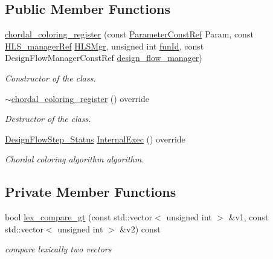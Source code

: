 \subsection*{Public Member Functions}
\begin{DoxyCompactItemize}
\item 
\hyperlink{classchordal__coloring__register_a39b63e92e57d05feaab4dd0363aa2e2f}{chordal\+\_\+coloring\+\_\+register} (const \hyperlink{Parameter_8hpp_a37841774a6fcb479b597fdf8955eb4ea}{Parameter\+Const\+Ref} Param, const \hyperlink{hls__manager_8hpp_acd3842b8589fe52c08fc0b2fcc813bfe}{H\+L\+S\+\_\+manager\+Ref} \hyperlink{classHLS__step_ade85003a99d34134418451ddc46a18e9}{H\+L\+S\+Mgr}, unsigned int \hyperlink{classHLSFunctionStep_a3e6434fd86c698b0c70520b859bff5b0}{fun\+Id}, const Design\+Flow\+Manager\+Const\+Ref \hyperlink{classDesignFlowStep_ab770677ddf087613add30024e16a5554}{design\+\_\+flow\+\_\+manager})
\begin{DoxyCompactList}\small\item\em Constructor of the class. \end{DoxyCompactList}\item 
\hyperlink{classchordal__coloring__register_a4c3218f3284d36d62e021f3f57c1e53f}{$\sim$chordal\+\_\+coloring\+\_\+register} () override
\begin{DoxyCompactList}\small\item\em Destructor of the class. \end{DoxyCompactList}\item 
\hyperlink{design__flow__step_8hpp_afb1f0d73069c26076b8d31dbc8ebecdf}{Design\+Flow\+Step\+\_\+\+Status} \hyperlink{classchordal__coloring__register_a28bdde20568880c6b074dcff39d0bf83}{Internal\+Exec} () override
\begin{DoxyCompactList}\small\item\em Chordal coloring algorithm algorithm. \end{DoxyCompactList}\end{DoxyCompactItemize}
\subsection*{Private Member Functions}
\begin{DoxyCompactItemize}
\item 
bool \hyperlink{classchordal__coloring__register_abef21ed03d914721aabd0cad2160fbb7}{lex\+\_\+compare\+\_\+gt} (const std\+::vector$<$ unsigned int $>$ \&v1, const std\+::vector$<$ unsigned int $>$ \&v2) const
\begin{DoxyCompactList}\small\item\em compare lexically two vectors \end{DoxyCompactList}\end{DoxyCompactItemize}
